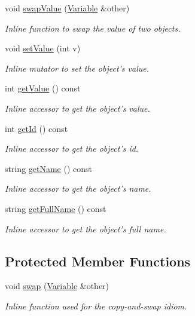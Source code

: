 \begin{DoxyCompactItemize}
\item 
void \hyperlink{classghost_1_1Variable_a8186ea296b868d44656be01e94b9aa80}{swap\-Value} (\hyperlink{classghost_1_1Variable}{Variable} \&other)
\begin{DoxyCompactList}\small\item\em Inline function to swap the value of two objects. \end{DoxyCompactList}\item 
void \hyperlink{classghost_1_1Variable_a6fe0abafde2231f18074ecab6d7325cd}{set\-Value} (int v)
\begin{DoxyCompactList}\small\item\em Inline mutator to set the object's value. \end{DoxyCompactList}\item 
int \hyperlink{classghost_1_1Variable_ae6dcadf662fc318265a9741d91a0e56e}{get\-Value} () const 
\begin{DoxyCompactList}\small\item\em Inline accessor to get the object's value. \end{DoxyCompactList}\item 
int \hyperlink{classghost_1_1Variable_af5128e3efaa50a99c5fe478496ab9a61}{get\-Id} () const 
\begin{DoxyCompactList}\small\item\em Inline accessor to get the object's id. \end{DoxyCompactList}\item 
string \hyperlink{classghost_1_1Variable_a89050a5f0798151d4b0a369339be9287}{get\-Name} () const 
\begin{DoxyCompactList}\small\item\em Inline accessor to get the object's name. \end{DoxyCompactList}\item 
string \hyperlink{classghost_1_1Variable_a179c5f5625d78740335fe11893811921}{get\-Full\-Name} () const 
\begin{DoxyCompactList}\small\item\em Inline accessor to get the object's full name. \end{DoxyCompactList}\end{DoxyCompactItemize}
\subsection*{Protected Member Functions}
\begin{DoxyCompactItemize}
\item 
void \hyperlink{classghost_1_1Variable_a01b3dfd2e865fed19b5edf0ced7d74bc}{swap} (\hyperlink{classghost_1_1Variable}{Variable} \&other)
\begin{DoxyCompactList}\small\item\em Inline function used for the copy-\/and-\/swap idiom. \end{DoxyCompactList}\end{DoxyCompactItemize}
